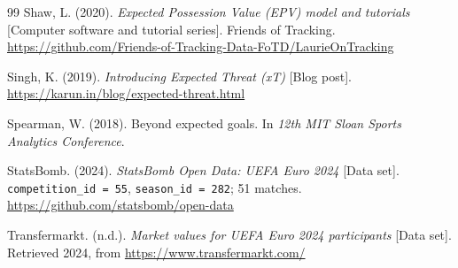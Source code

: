 \documentclass[12pt,a4paper]{article}
\begin{document}
\begin{thebibliography}{99}
Shaw, L. (2020).
\emph{Expected Possession Value (EPV) model and tutorials} [Computer software and tutorial series].
Friends of Tracking.
\url{https://github.com/Friends-of-Tracking-Data-FoTD/LaurieOnTracking}

Singh, K. (2019).
\emph{Introducing Expected Threat (xT)} [Blog post].
\url{https://karun.in/blog/expected-threat.html}

Spearman, W. (2018).
Beyond expected goals.
In \emph{12th MIT Sloan Sports Analytics Conference}.

StatsBomb. (2024).
\emph{StatsBomb Open Data: UEFA Euro 2024} [Data set].
\texttt{competition\_id\,=\,55}, \texttt{season\_id\,=\,282}; 51 matches.
\url{https://github.com/statsbomb/open-data}

Transfermarkt. (n.d.).
\emph{Market values for UEFA Euro 2024 participants} [Data set].
Retrieved 2024, from \url{https://www.transfermarkt.com/}

\end{thebibliography}

\end{document}
